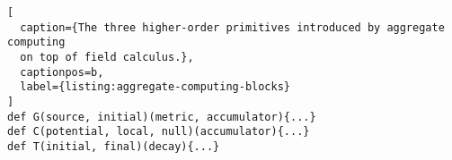 \begin{lstlisting}[
  caption={The three higher-order primitives introduced by aggregate computing
  on top of field calculus.},
  captionpos=b,
  label={listing:aggregate-computing-blocks}
]
def G(source, initial)(metric, accumulator){...}
def C(potential, local, null)(accumulator){...}
def T(initial, final)(decay){...}
\end{lstlisting}